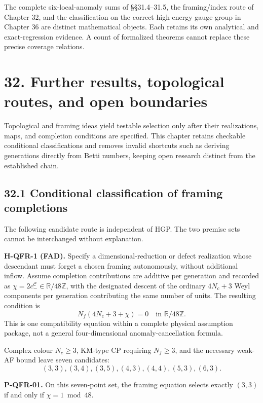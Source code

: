 \documentclass[
  11pt,
  oneside]{book}
\begin{document}
The complete six-local-anomaly sums of §§31.4--31.5, the framing/index
route of Chapter 32, and the classification on the correct high-energy
gauge group in Chapter 36 are distinct mathematical objects. Each
retains its own analytical and exact-regression evidence. A count of
formalized theorems cannot replace these precise coverage relations.

\chapter{32. Further results, topological routes, and open
boundaries}\label{ch-32}

Topological and framing ideas yield testable selection only after their
realizations, maps, and completion conditions are specified. This
chapter retains checkable conditional classifications and removes
invalid shortcuts such as deriving generations directly from Betti
numbers, keeping open research distinct from the established chain.

\section{32.1 Conditional classification of framing completions}

The following candidate route is independent of HGP. The two premise
sets cannot be interchanged without explanation.

\textbf{H-QFR-1 (FAD).} Specify a dimensional-reduction or defect
realization whose descendant must forget a chosen framing autonomously,
without additional inflow. Assume completion contributions are additive
per generation and recorded as
\(\chi=2c_-^{\mathcal C}\in\mathbb R/48\mathbb Z\), with the designated
descent of the ordinary \(4N_c+3\) Weyl components per generation
contributing the same number of units. The resulting condition is \[
N_f(4N_c+3+\chi)=0\quad\text{in }\mathbb R/48\mathbb Z.
\] This is one compatibility equation within a complete physical
assumption package, not a general four-dimensional anomaly-cancellation
formula.

Complex colour \(N_c\ge3\), KM-type CP requiring \(N_f\ge3\), and the
necessary weak-AF bound leave seven candidates: \[
(3,3),(3,4),(3,5),(4,3),(4,4),(5,3),(6,3).
\]

\label{p-qfr-01}{}

\textbf{P-QFR-01.} On this seven-point set, the framing equation selects
exactly \((3,3)\) if and only if \(\chi=1\bmod48\).
\end{document}

